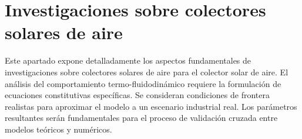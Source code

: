 \section{Investigaciones sobre colectores solares de aire}
\label{sec:cap03_investigaciones}

Este apartado expone detalladamente los aspectos fundamentales de investigaciones sobre colectores solares de aire para el colector solar de aire.
El análisis del comportamiento termo-fluidodinámico requiere la formulación de ecuaciones constitutivas específicas.
Se consideran condiciones de frontera realistas para aproximar el modelo a un escenario industrial real.
Los parámetros resultantes serán fundamentales para el proceso de validación cruzada entre modelos teóricos y numéricos.
